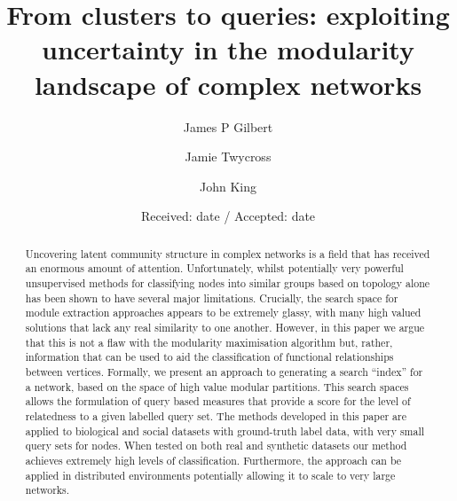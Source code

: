 \documentclass[manuscript, proceedings]{acmart}
\date{Received: date / Accepted: date}
\begin{document}
\title{From clusters to queries: exploiting uncertainty in the modularity landscape of complex networks}

\author{James P Gilbert}

\author{Jamie Twycross}

\author{John King}


\begin{abstract}
Uncovering latent community structure in complex networks is a field that has received an enormous amount of attention.
Unfortunately, whilst potentially very powerful unsupervised methods for classifying nodes into similar groups based on topology alone has been shown to have several major limitations.
Crucially, the search space for module extraction approaches appears to be extremely glassy, with many high valued solutions that lack any real similarity to one another.
However, in this paper we argue that this is not a flaw with the modularity maximisation algorithm but, rather, information that can be used to aid the classification of functional relationships between vertices.
Formally, we present an approach to generating a search ``index'' for a network, based on the space of high value modular partitions.
This search spaces allows the formulation of query based measures that provide a score for the level of relatedness to a given labelled query set.
The methods developed in this paper are applied to biological and social datasets with ground-truth label data, with very small query sets for nodes.
When tested on both real and synthetic datasets our method achieves extremely high levels of classification.
Furthermore, the approach can be applied in distributed environments potentially allowing it to scale to very large networks.
\end{abstract}

\maketitle
\end{document}
